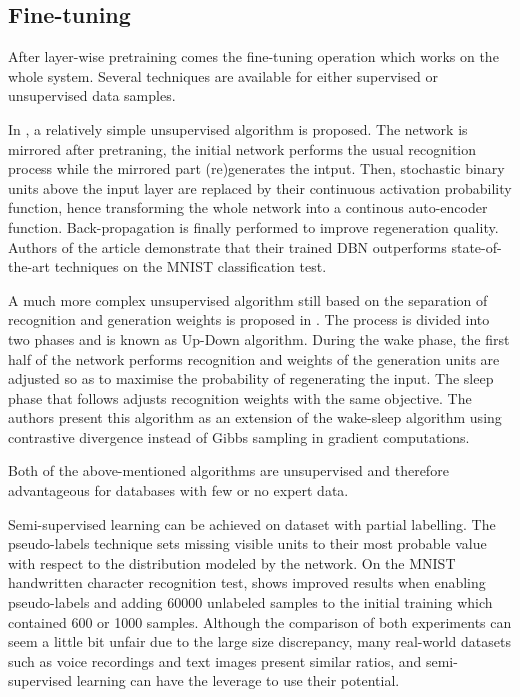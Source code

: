 \documentclass{report}
\begin{document}
	\subsection{Fine-tuning}
	
	After layer-wise pretraining comes the fine-tuning operation which works on the 
	whole system. Several techniques are available for either supervised or 
	unsupervised data samples. 
	
	In \cite{hinton2006reducing}, a relatively simple unsupervised algorithm 
	is proposed. The network is mirrored after pretraning, the initial network 
	performs the usual recognition process while the mirrored part (re)generates 
	the intput. Then, stochastic binary units above the input layer are replaced by 
	their continuous activation probability function, hence transforming the whole 
	network into a continous auto-encoder function. Back-propagation is finally
	performed to improve regeneration quality. Authors of the article demonstrate 
	that their trained DBN outperforms state-of-the-art techniques on the MNIST 
	classification test.
	
	A much more complex unsupervised algorithm still based on the separation of 
	recognition and generation weights is proposed in 
	\cite{hinton2006fast}. The process is divided into two phases 
	and is known as Up-Down algorithm. During the wake phase, the first half of the 
	network performs recognition and weights of the generation units are adjusted 
	so as to maximise the probability of regenerating the input. The sleep phase 
	that follows adjusts recognition weights with the same objective. The authors 
	present this algorithm as an extension of the wake-sleep algorithm 
	\cite{hinton1995wake} using contrastive divergence instead of Gibbs sampling in 
	gradient computations.
	
	Both of the above-mentioned algorithms are unsupervised and therefore 
	advantageous for databases with few or no expert data. 
	
	Semi-supervised learning can be achieved on dataset with partial labelling. The 
	pseudo-labels technique sets missing visible units to their most probable value 
	with respect to the distribution modeled by the network. On the MNIST 
	handwritten character recognition test, \cite{lee2013pseudo} shows improved 
	results when enabling pseudo-labels and adding 60000 unlabeled samples to the 
	initial training which contained 600 or 1000 samples. Although the comparison 
	of both experiments can seem a little bit unfair due to the large size 
	discrepancy, many real-world datasets such as voice recordings and text images 
	present similar ratios, and semi-supervised learning can have the leverage to 
	use their potential.
	
\end{document}
